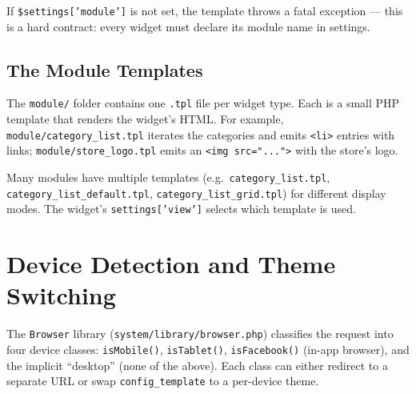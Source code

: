 \documentclass[11pt,a4paper]{article}
\begin{document}
If \texttt{\$settings['module']} is not set, the template throws a
fatal exception --- this is a hard contract: every widget must
declare its module name in settings.

\subsection{The Module Templates}

The \texttt{module/} folder contains one \texttt{.tpl} file per
widget type. Each is a small PHP template that renders the
widget's HTML. For example, \texttt{module/category\_list.tpl}
iterates the categories and emits \texttt{<li>} entries with
links; \texttt{module/store\_logo.tpl} emits an
\texttt{<img src="...">} with the store's logo.

Many modules have multiple templates (e.g.\
\texttt{category\_list.tpl},
\texttt{category\_list\_default.tpl}, \texttt{category\_list\_grid.tpl})
for different display modes. The widget's \texttt{settings['view']}
selects which template is used.

\section{Device Detection and Theme Switching}\label{sec:device}

The \texttt{Browser} library (\texttt{system/library/browser.php})
classifies the request into four device classes:
\texttt{isMobile()}, \texttt{isTablet()}, \texttt{isFacebook()}
(in-app browser), and the implicit ``desktop'' (none of the
above). Each class can either redirect to a separate URL or swap
\texttt{config\_template} to a per-device theme.
\end{document}

